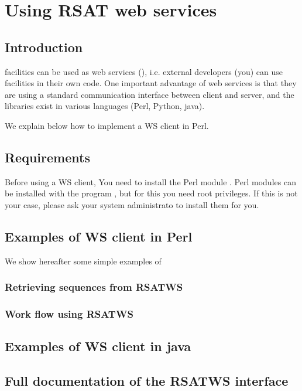 
\section{Using RSAT web services}

\subsection{Introduction}

\RSAT facilities can be used as web services (), i.e. external developers
(you) can use \RSAT facilities in their own code. One important
advantage of web services is that they are using a standard
communication interface between client and server, and the libraries
exist in various languages (Perl, Python, java).

We explain below how to implement a WS client in Perl. 

\subsection{Requirements}

Before using a WS client, You need to install the Perl module
. Perl modules can be installed with the program
, but for this you need root privileges. If this is not
your case, please ask your system administrato to install them for
you.

\subsection{Examples of WS client in Perl}

We show hereafter some simple examples of 

\subsubsection{Retrieving sequences from RSATWS}


\subsubsection{Work flow using RSATWS}


\subsection{Examples of WS client in java}


\subsection{Full documentation of the RSATWS interface}







